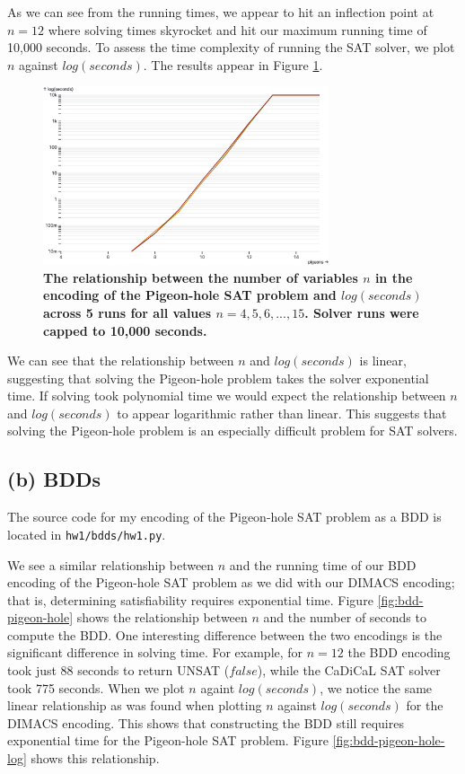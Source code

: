 \documentclass{article}
\newcommand{\code}[1]{\texttt{#1}}
\begin{document}
\medskip
\noindent As we can see from the running times, we appear to hit an inflection point at $n = 12$ where solving times skyrocket and hit our maximum running time of 10,000 seconds. To assess the time complexity of running the SAT solver, we plot $n$ against $log(seconds)$. The results appear in Figure \ref{fig:solver-times-log}.

\begin{figure}
  \centering
  \includegraphics[width=0.75\textwidth]{pigeon-hole-log}
  \caption{\textbf{The relationship between the number of variables $n$ in the encoding of the Pigeon-hole SAT problem and $log(seconds)$ across 5 runs for all values $n = 4, 5, 6,...,15$. Solver runs were capped to 10,000 seconds.}}
  \label{fig:solver-times-log}
\end{figure}

\medskip
\noindent We can see that the relationship between $n$ and $log(seconds)$ is linear, suggesting that solving the Pigeon-hole problem takes the solver exponential time. If solving took polynomial time we would expect the relationship between $n$ and $log(seconds)$ to appear logarithmic rather than linear. This suggests that solving the Pigeon-hole problem is an especially difficult problem for SAT solvers.

\subsection{(b) BDDs}

\noindent The source code for my encoding of the Pigeon-hole SAT problem as a BDD is located in \code{hw1/bdds/hw1.py}.

\medskip
\noindent We see a similar relationship between $n$ and the running time of our BDD encoding of the Pigeon-hole SAT problem as we did with our DIMACS encoding; that is, determining satisfiability requires exponential time. Figure \ref{fig:bdd-pigeon-hole} shows the relationship between $n$ and the number of seconds to compute the BDD. One interesting difference between the two encodings is the significant difference in solving time. For example, for $n=12$ the BDD encoding took just 88 seconds to return UNSAT ($false$), while the CaDiCaL SAT solver took 775 seconds. When we plot $n$ againt $log(seconds)$, we notice the same linear relationship as was found when plotting $n$ against $log(seconds)$ for the DIMACS encoding. This shows that constructing the BDD still requires exponential time for the Pigeon-hole SAT problem. Figure \ref{fig:bdd-pigeon-hole-log} shows this relationship.
\end{document}

